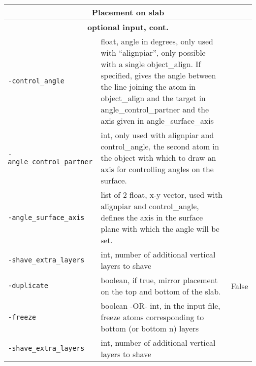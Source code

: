 \begin{tabular}{|p{5.25cm}|p{8cm}|p{2.75cm}|}
\hline
\multicolumn{3}{|c|}{\Large \textbf{Placement on slab}}\\ \hline                        
\multicolumn{3}{|c|}{ \textbf{optional input, cont.}}\\ \hline  
\texttt{-control\_angle} & float, angle in degrees, only used with “alignpiar”, only possible with a single object\_align. If specified, gives the angle between the line joining the atom in object\_align and the target in angle\_control\_partner and the axis given in angle\_surface\_axis &  \\
 \texttt{-angle\_control\_partner } & 
int, only used with alignpiar and control\_angle, the second atom in the object with which to draw an axis for controlling angles on the surface. &  \\
\texttt{-angle\_surface\_axis } & list of 2 float, x-y vector, used with alignpiar and control\_angle, defines the axis in the surface plane with which the angle will be set. &  \\
 \texttt{-shave\_extra\_layers } & int, number of additional vertical layers to shave &  \\
\texttt{-duplicate} & boolean, if true, mirror placement on the top and bottom of the slab. & False\\
\texttt{-freeze } & boolean -OR- int, in the input file, freeze atoms corresponding to bottom (or bottom n) layers &  \\
\texttt{-shave\_extra\_layers } & int, number of additional vertical layers to shave &  \\
\hline
\end{tabular}




